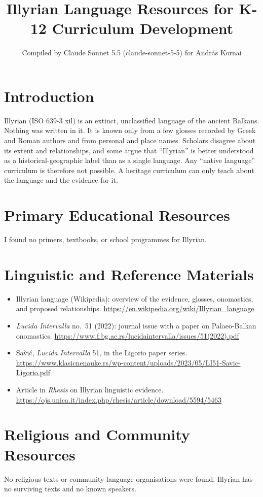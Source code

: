 \documentclass[12pt]{article}
\title{Illyrian Language Resources for K-12 Curriculum Development}
\author{Compiled by Claude Sonnet 5.5 (claude-sonnet-5-5) for Andr\'as Kornai}
\date{}
\begin{document}
\maketitle

\section{Introduction}
Illyrian (ISO 639-3 xil) is an extinct, unclassified language of the ancient Balkans. Nothing was written in it. It is known only from a few glosses recorded by Greek and Roman authors and from personal and place names. Scholars disagree about its extent and relationships, and some argue that ``Illyrian'' is better understood as a historical-geographic label than as a single language. Any ``native language'' curriculum is therefore not possible. A heritage curriculum can only teach about the language and the evidence for it.

\section{Primary Educational Resources}
I found no primers, textbooks, or school programmes for Illyrian.

\section{Linguistic and Reference Materials}
\begin{itemize}
\item Illyrian language (Wikipedia): overview of the evidence, glosses, onomastics, and proposed relationships. \url{https://en.wikipedia.org/wiki/Illyrian_language}
\item \emph{Lucida Intervalla} no.\ 51 (2022): journal issue with a paper on Palaeo-Balkan onomastics. \url{https://www.f.bg.ac.rs/lucidaintervalla/issues/51(2022).pdf}
\item Sa\v{v}i\'c, \emph{Lucida Intervalla} 51, in the Ligorio paper series. \url{https://www.klasicnenauke.rs/wp-content/uploads/2023/05/LI51-Savic-Ligorio.pdf}
\item Article in \emph{Rhesis} on Illyrian linguistic evidence. \url{https://ojs.unica.it/index.php/rhesis/article/download/5594/5463}
\end{itemize}

\section{Religious and Community Resources}
No religious texts or community language organisations were found. Illyrian has no surviving texts and no known speakers.
\end{document}
